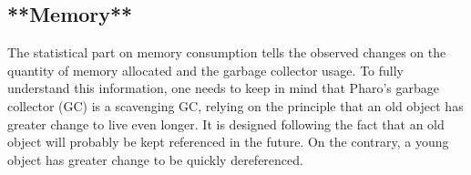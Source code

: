 \documentclass[a4paper,10pt,twoside]{book}
\begin{document}
%
%
%
%
%
%
%
%
%

\subsection{**Memory**}

The statistical part on memory consumption tells the observed changes on the quantity of memory allocated and the garbage collector usage. To fully understand this information, one needs to keep in mind that Pharo's garbage collector (GC) is a scavenging GC, relying on the principle that an old object has greater change to live even longer. It is designed following the fact that an old object will probably be kept referenced in the future. On the contrary, a young object has greater change to be quickly dereferenced. 
\end{document}
